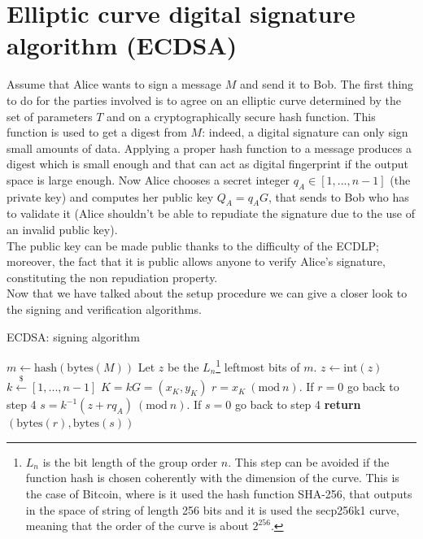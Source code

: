 \bigskip

\section{Elliptic curve digital signature algorithm (ECDSA)}
Assume that Alice wants to sign a message $M$ and send it to Bob. The first thing to do for the parties involved is to agree on an elliptic curve determined by the set of parameters $T$ and on a cryptographically secure hash function. This function is used to get a digest from $M$: indeed, a digital signature can only sign small amounts of data. Applying a proper hash function to a message produces a digest which is small enough and that can act as digital fingerprint if the output space is large enough. Now Alice chooses a secret integer $q_A \in [1, ..., n - 1]$ (the private key) and computes her public key $Q_A = q_AG$, that sends to Bob who has to validate it (Alice shouldn't be able to repudiate the signature due to the use of an invalid public key). 
\\
The public key can be made public thanks to the difficulty of the ECDLP; moreover, the fact that it is public allows anyone to verify Alice's signature, constituting the non repudiation property.
\\
Now that we have talked about the setup procedure we can give a closer look to the signing and verification algorithms.

\bigskip

\begin{algorithm}
	\caption{ECDSA: signing algorithm}
	\label{alg:ecdsa_sig}
	\begin{algorithmic}[1]
		\State $m \gets \text{hash}(\text{bytes}(M))$
		\State Let $z$ be the $L_n$\footnote{$L_n$ is the bit length of the group order $n$. This step can be avoided if the function hash is chosen coherently with the dimension of the curve. This is the case of Bitcoin, where is it used the hash function SHA-256, that outputs in the space of string of length 256 bits and it is used the secp256k1 curve, meaning that the order of the curve is about $2^{256}$.} leftmost bits of $m$. $z \gets \text{int}(z)$
		\State $k \xleftarrow{\text{\$}} [1, ..., n - 1]$
		\State $K = kG = (x_K, y_K)$
		\State $r = x_K \ (\text{mod} \ n)$. If $r = 0$ go back to step 4
		\State $s = k^{-1}(z + rq_A) \ (\text{mod} \ n)$. If $s = 0$ go back to step 4
		\State \textbf{return} $(\text{bytes}(r), \text{bytes}(s))$
		\EndProcedure
	\end{algorithmic}
\end{algorithm}

